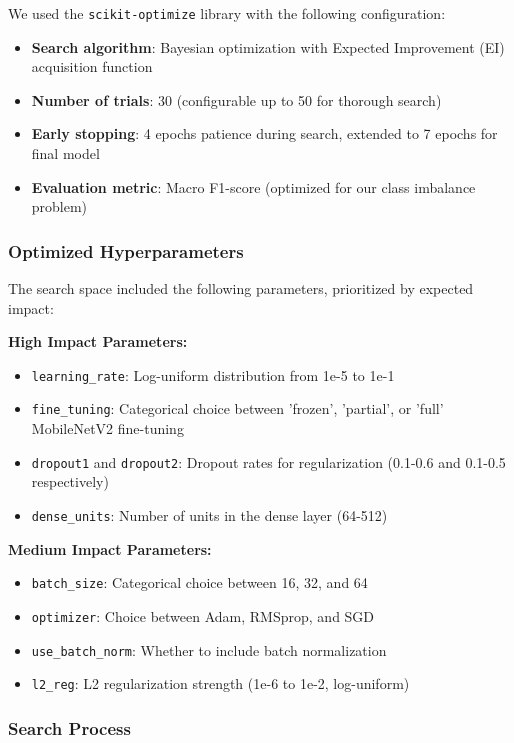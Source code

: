 \documentclass[12pt,a4paper]{article}
\begin{document}
We used the \texttt{scikit-optimize} library with the following configuration:

\begin{itemize}
    \item \textbf{Search algorithm}: Bayesian optimization with Expected Improvement (EI) acquisition function
    \item \textbf{Number of trials}: 30 (configurable up to 50 for thorough search)
    \item \textbf{Early stopping}: 4 epochs patience during search, extended to 7 epochs for final model
    \item \textbf{Evaluation metric}: Macro F1-score (optimized for our class imbalance problem)
\end{itemize}

\subsubsection{Optimized Hyperparameters}

The search space included the following parameters, prioritized by expected impact:

\textbf{High Impact Parameters:}
\begin{itemize}
    \item \texttt{learning\_rate}: Log-uniform distribution from 1e-5 to 1e-1
    \item \texttt{fine\_tuning}: Categorical choice between 'frozen', 'partial', or 'full' MobileNetV2 fine-tuning
    \item \texttt{dropout1} and \texttt{dropout2}: Dropout rates for regularization (0.1-0.6 and 0.1-0.5 respectively)
    \item \texttt{dense\_units}: Number of units in the dense layer (64-512)
\end{itemize}

\textbf{Medium Impact Parameters:}
\begin{itemize}
    \item \texttt{batch\_size}: Categorical choice between 16, 32, and 64
    \item \texttt{optimizer}: Choice between Adam, RMSprop, and SGD
    \item \texttt{use\_batch\_norm}: Whether to include batch normalization
    \item \texttt{l2\_reg}: L2 regularization strength (1e-6 to 1e-2, log-uniform)
\end{itemize}

\subsubsection{Search Process}
\end{document}
